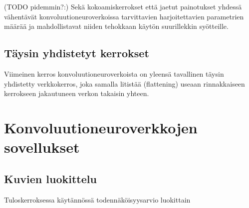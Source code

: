 \documentclass[finnish]{tktltiki2}
\theoremstyle{definition}
\theoremstyle{remark}
\begin{document}
    (TODO pidemmin?:) Sekä kokoamiskerrokset että jaetut painotukset yhdessä vähentävät konvoluutioneuroverkoissa tarvittavien harjoitettavien parametrien määrää ja mahdollistavat niiden tehokkaan käytön suurillekkin syötteille.

    \subsection{Täysin yhdistetyt kerrokset}
    Viimeinen kerros konvoluutioneuroverkoista on yleensä tavallinen täysin yhdistetty verkkokerros, joka samalla litistää (flattening) useaan rinnakkaiseen kerrokseen jakautuneen verkon takaisin yhteen.

  \section{Konvoluutioneuroverkkojen sovellukset}
  \subsection{Kuvien luokittelu}
  Tuloskerroksessa käytännössä todennäköisyysarvio luokittain












  \nocite{*}
  
  





  
\end{document}
